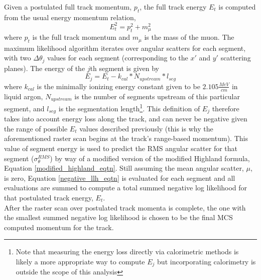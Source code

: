 Given a postulated full track momentum, $p_t$, the full track energy $E_t$ is computed from the usual energy momentum relation,
\begin{equation}\label{energy_momentum_relation_eqtn}
E_t^2 = p_t^2 + m_\mu^2
\end{equation}
 where $p_t$ is the full track momentum and $m_\mu$ is the mass of the muon. The maximum likelihood algorithm iterates over angular scatters for each segment, with two $\Delta\theta_j$ values for each segment (corresponding to the $x'$ and $y'$ scattering planes). The energy of the $j$th segment is given by
\begin{equation}\label{segment_E_equation}
E_{j} = E_t - k_{cal}*N_{upstream}*l_{seg}
\end{equation}
where $k_{cal}$ is the minimally ionizing energy constant given to be $2.105 \frac{MeV}{cm}$ in liquid argon\cite{MIPenergysource}, $N_{upstream}$ is the number of segments upstream of this particular segment, and $l_{seg}$ is the segmentation length\footnote{Note that measuring the energy loss directly via calorimetric methods is likely a more appropriate way to compute $E_j$ but incorporating calorimetry is outside the scope of this analysis}. This definition of $E_j$ therefore takes into account energy loss along the track, and can never be negative given the range of possible $E_t$ values described previously (this is why the aforementioned raster scan begins at the track's range-based momentum). This value of segment energy is used to predict the RMS angular scatter for that segment ($\sigma_\theta^{RMS}$) by way of a modified version of the modified Highland formula, Equation \ref{modified_highland_eqtn}. Still assuming the mean angular scatter, $\mu$, is zero, Equation \ref{negative_llh_eqtn} is evaluated for each segment and all evaluations are summed to compute a total summed negative log likelihood for that postulated track energy, $E_t$.\\

After the raster scan over postulated track momenta is complete, the one with the smallest summed negative log likelihood is chosen to be the final MCS computed momentum for the track.
